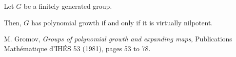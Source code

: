\documentclass[12pt]{article}
\begin{document}
Let $G$ be a finitely generated group.

Then, $G$ has polynomial growth if and only if it is virtually nilpotent.



\begin{thebibliography}{9}
M. Gromov, \emph{Groups of polynomial growth and expanding maps},
Publications Math\'{e}matique d'IH\'{E}S 53 (1981), pages 53 to 78.
\end{thebibliography}
\end{document}
